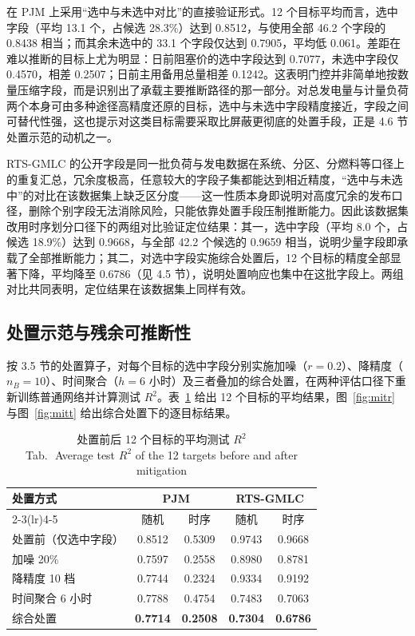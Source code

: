 \documentclass[UTF8,zihao=5,twoside]{ctexart}
\newcommand{\tabbicaption}[2]{\caption{#1\\[-0.2em]\small Tab.\,\thetable\ #2}}
\begin{document}
在 PJM 上采用“选中与未选中对比”的直接验证形式。12 个目标平均而言，选中字段（平均 13.1 个，占候选 28.3\%）达到 0.8512，与使用全部 46.2 个字段的 0.8438 相当；而其余未选中的 33.1 个字段仅达到 0.7905，平均低 0.061。差距在难以推断的目标上尤为明显：日前阻塞价的选中字段达到 0.7077，未选中字段仅 0.4570，相差 0.2507；日前主用备用总量相差 0.1242。这表明门控并非简单地按数量压缩字段，而是识别出了承载主要推断路径的那一部分。对总发电量与计量负荷两个本身可由多种途径高精度还原的目标，选中与未选中字段精度接近，字段之间可替代性强，这也提示对这类目标需要采取比屏蔽更彻底的处置手段，正是 4.6 节处置示范的动机之一。

RTS-GMLC 的公开字段是同一批负荷与发电数据在系统、分区、分燃料等口径上的重复汇总，冗余度极高，任意较大的字段子集都能达到相近精度，“选中与未选中”的对比在该数据集上缺乏区分度——这一性质本身即说明对高度冗余的发布口径，删除个别字段无法消除风险，只能依靠处置手段压制推断能力。因此该数据集改用时序划分口径下的两组对比验证定位结果：其一，选中字段（平均 8.0 个，占候选 18.9\%）达到 0.9668，与全部 42.2 个候选的 0.9659 相当，说明少量字段即承载了全部推断能力；其二，对选中字段实施综合处置后，12 个目标的精度全部显著下降，平均降至 0.6786（见 4.5 节），说明处置响应也集中在这批字段上。两组对比共同表明，定位结果在该数据集上同样有效。

\FloatBarrier
\subsection{处置示范与残余可推断性}

按 3.5 节的处置算子，对每个目标的选中字段分别实施加噪（$r=0.2$）、降精度（$n_B=10$）、时间聚合（$h=6$ 小时）及三者叠加的综合处置，在两种评估口径下重新训练普通网络并计算测试 $R^2$。表~\ref{tab:mit} 给出 12 个目标的平均结果，图~\ref{fig:mitr} 与图~\ref{fig:mitt} 给出综合处置下的逐目标结果。

\begin{table}[!tbp]
\centering
\tabbicaption{处置前后 12 个目标的平均测试 $R^2$}{Average test $R^2$ of the 12 targets before and after mitigation}
\label{tab:mit}
\setlength{\tabcolsep}{4.0pt}
\begin{tabular}{lcccc}
\toprule
\multirow{2}{*}{处置方式} & \multicolumn{2}{c}{PJM} & \multicolumn{2}{c}{RTS-GMLC} \\
\cmidrule(lr){2-3}\cmidrule(lr){4-5}
 & 随机 & 时序 & 随机 & 时序 \\
\midrule
处置前（仅选中字段） & 0.8512 & 0.5309 & 0.9743 & 0.9668 \\
\midrule
加噪 20\% & 0.7597 & 0.2558 & 0.8980 & 0.8781 \\
降精度 10 档 & 0.7744 & 0.2324 & 0.9334 & 0.9192 \\
时间聚合 6 小时 & 0.7788 & 0.4754 & 0.7483 & 0.7063 \\
综合处置 & \textbf{0.7714} & \textbf{0.2508} & \textbf{0.7304} & \textbf{0.6786} \\
\bottomrule
\end{tabular}
\end{table}
\end{document}
